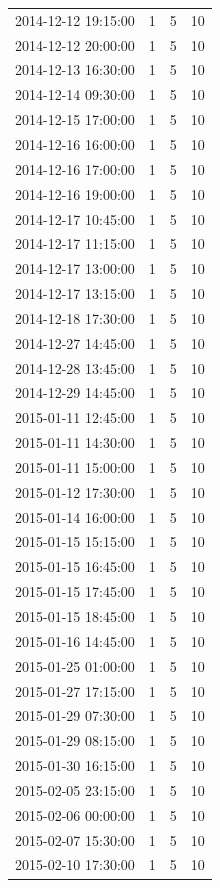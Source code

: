 \begin{tabular}{lrrr}
2014-12-12 19:15:00 & 1 & 5 & 10 \\
2014-12-12 20:00:00 & 1 & 5 & 10 \\
2014-12-13 16:30:00 & 1 & 5 & 10 \\
2014-12-14 09:30:00 & 1 & 5 & 10 \\
2014-12-15 17:00:00 & 1 & 5 & 10 \\
2014-12-16 16:00:00 & 1 & 5 & 10 \\
2014-12-16 17:00:00 & 1 & 5 & 10 \\
2014-12-16 19:00:00 & 1 & 5 & 10 \\
2014-12-17 10:45:00 & 1 & 5 & 10 \\
2014-12-17 11:15:00 & 1 & 5 & 10 \\
2014-12-17 13:00:00 & 1 & 5 & 10 \\
2014-12-17 13:15:00 & 1 & 5 & 10 \\
2014-12-18 17:30:00 & 1 & 5 & 10 \\
2014-12-27 14:45:00 & 1 & 5 & 10 \\
2014-12-28 13:45:00 & 1 & 5 & 10 \\
2014-12-29 14:45:00 & 1 & 5 & 10 \\
2015-01-11 12:45:00 & 1 & 5 & 10 \\
2015-01-11 14:30:00 & 1 & 5 & 10 \\
2015-01-11 15:00:00 & 1 & 5 & 10 \\
2015-01-12 17:30:00 & 1 & 5 & 10 \\
2015-01-14 16:00:00 & 1 & 5 & 10 \\
2015-01-15 15:15:00 & 1 & 5 & 10 \\
2015-01-15 16:45:00 & 1 & 5 & 10 \\
2015-01-15 17:45:00 & 1 & 5 & 10 \\
2015-01-15 18:45:00 & 1 & 5 & 10 \\
2015-01-16 14:45:00 & 1 & 5 & 10 \\
2015-01-25 01:00:00 & 1 & 5 & 10 \\
2015-01-27 17:15:00 & 1 & 5 & 10 \\
2015-01-29 07:30:00 & 1 & 5 & 10 \\
2015-01-29 08:15:00 & 1 & 5 & 10 \\
2015-01-30 16:15:00 & 1 & 5 & 10 \\
2015-02-05 23:15:00 & 1 & 5 & 10 \\
2015-02-06 00:00:00 & 1 & 5 & 10 \\
2015-02-07 15:30:00 & 1 & 5 & 10 \\
2015-02-10 17:30:00 & 1 & 5 & 10 \\

\end{tabular}
